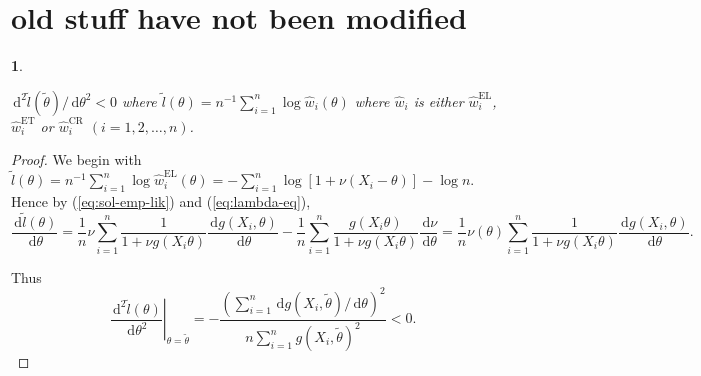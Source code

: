 \documentclass[oneside,english]{amsbook}
\numberwithin{section}{chapter}
\numberwithin{equation}{section}
\numberwithin{figure}{section}
\theoremstyle{plain}
\newtheorem{lem}{\protect\lemmaname}
\theoremstyle{plain}
\theoremstyle{definition}
\theoremstyle{plain}
\theoremstyle{plain}
\theoremstyle{remark}
\theoremstyle{definition}
\theoremstyle{definition}
\newcommand{\diff}{\,\mathrm{d}}
\providecommand{\lemmaname}{Lemma}
\begin{document}
\section{old stuff have not been modified}
\begin{lem}
\label{lem:bell-shape-el} %

$\diff^{2}\tilde{l}\left(\tilde{\theta}\right)/\diff\theta^{2}<0$
where $\tilde{l}\left(\theta\right)=n^{-1}\sum_{i=1}^{n}\log\hat{w}_{i}\left(\theta\right)$
where $\hat{w}_{i}$ is either $\hat{w}_{i}^{\mathrm{EL}}$, $\hat{w}_{i}^{\mathrm{ET}}$
or $\hat{w}_{i}^{\mathrm{CR}}$ $\left(i=1,2,\ldots,n\right)$.\end{lem}
\begin{proof}
We begin with $\tilde{l}\left(\theta\right)=n^{-1}\sum_{i=1}^{n}\log\hat{w}_{i}^{\mathrm{EL}}\left(\theta\right)=-\sum_{i=1}^{n}\log\left[1+\nu\left(X_{i}-\theta\right)\right]-\log n$.
Hence by (\ref{eq:sol-emp-lik}) and (\ref{eq:lambda-eq}), 
\[
\frac{\diff\tilde{l}\left(\theta\right)}{\diff\theta}=\frac{1}{n}\nu\sum_{i=1}^{n}\frac{1}{1+\nu g\left(X_{i}\theta\right)}\frac{\diff g\left(X_{i},\theta\right)}{\diff\theta}-\frac{1}{n}\sum_{i=1}^{n}\frac{g\left(X_{i}\theta\right)}{1+\nu g\left(X_{i}\theta\right)}\frac{\diff\nu}{\diff\theta}=\frac{1}{n}\nu\left(\theta\right)\sum_{i=1}^{n}\frac{1}{1+\nu g\left(X_{i}\theta\right)}\frac{\diff g\left(X_{i},\theta\right)}{\diff\theta}.
\]


Thus 
\[
\left.\frac{\diff^{2}\tilde{l}\left(\theta\right)}{\diff\theta^{2}}\right|_{\theta=\tilde{\theta}}=-\frac{\left(\sum_{i=1}^{n}\diff g\left(X_{i},\tilde{\theta}\right)/\diff\theta\right)^{2}}{n\sum_{i=1}^{n}g\left(X_{i},\tilde{\theta}\right)^{2}}<0.
\]



\end{proof}
\end{document}
